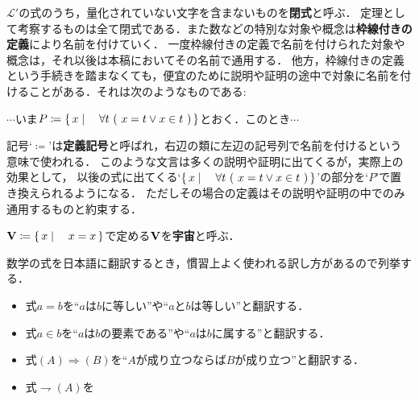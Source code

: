 	$\mathcal{L}'$の式のうち，量化されていない文字を含まないものを{\bf 閉式}と呼ぶ．
	定理として考察するものは全て閉式である．また数などの特別な対象や概念は{\bf 枠線付きの定義}により名前を付けていく．
	一度枠線付きの定義で名前を付けられた対象や概念は，それ以後は本稿においてその名前で通用する．
	他方，枠線付きの定義という手続きを踏まなくても，便宜のために説明や証明の途中で対象に名前を付けることがある．それは次のようなものである: 
	\begin{prf}
		$\cdots$いま$P \coloneqq \Set{x}{\forall t\ (\ x = t \vee x \in t\ )}$とおく．このとき$\cdots$
	\end{prf}
	記号`$\coloneqq$'は{\bf 定義記号}と呼ばれ，右辺の類に左辺の記号列で名前を付けるという意味で使われる．
	このような文言は多くの説明や証明に出てくるが，実際上の効果として，
	以後の式に出てくる`$\Set{x}{\forall t\ (\ x = t \vee x \in t\ )}$'の部分を`$P$'で置き換えられるようになる．
	ただしその場合の定義はその説明や証明の中でのみ通用するものと約束する．
	
	\begin{screen}
		\begin{dfn}[宇宙]
			$\mathbf{V} \coloneqq \left\{\, x \mid \quad x=x\, \right\}$で定める$\mathbf{V}$を{\bf 宇宙}と呼ぶ．
		\end{dfn}
	\end{screen}
	
	
	数学の式を日本語に翻訳するとき，慣習上よく使われる訳し方があるので列挙する．
	\begin{itemize}
		\item 式$a = b$を``$a$は$b$に等しい''や``$a$と$b$は等しい''と翻訳する．
		\item 式$a \in b$を``$a$は$b$の要素である''や``$a$は$b$に属する''と翻訳する．
		\item 式$(A) \Longrightarrow (B)$を``$A$が成り立つならば$B$が成り立つ''と翻訳する．
		\item 式$\rightharpoondown (A)$を%
	\end{itemize}
	
